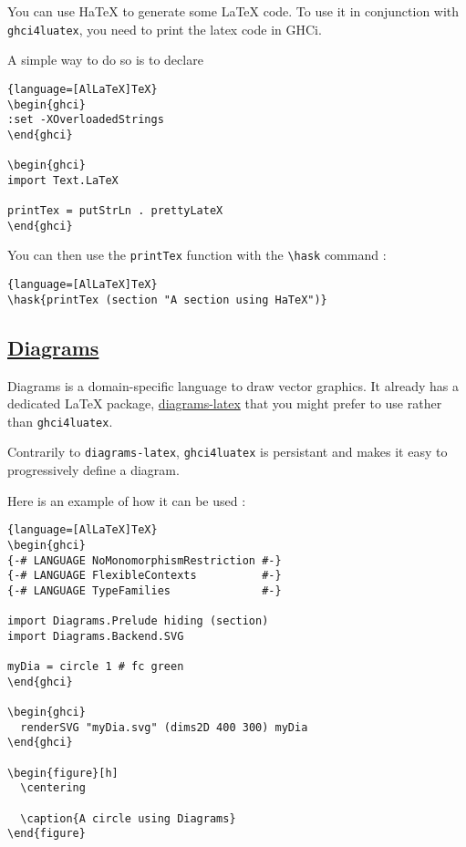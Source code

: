 \documentclass{article}
\begin{document}
You can use HaTeX to generate some LaTeX code. To use it in conjunction with \texttt{ghci4luatex}, you need to print the latex code in GHCi.

A simple way to do so is to declare

\begin{latexbox}
  \begin{lstlisting}{language=[AlLaTeX]TeX}
\begin{ghci}
:set -XOverloadedStrings
\end{ghci}

\begin{ghci}
import Text.LaTeX

printTex = putStrLn . prettyLateX
\end{ghci}
\end{lstlisting}
\end{latexbox}

You can then use the \texttt{printTex} function with the \texttt{\textbackslash hask} command :

\begin{lstlisting}{language=[AlLaTeX]TeX}
\hask{printTex (section "A section using HaTeX")}
\end{lstlisting}

\subsection{\href{https://diagrams.github.io/}{Diagrams}}

Diagrams is a domain-specific language to draw vector graphics. It already has a dedicated LaTeX package, \href{https://archives.haskell.org/projects.haskell.org/diagrams/doc/latex.html}{diagrams-latex} that you might prefer to use rather than \texttt{ghci4luatex}.

Contrarily to \texttt{diagrams-latex}, \texttt{ghci4luatex} is persistant and makes it easy to progressively define a diagram.

Here is an example of how it can be used :


\begin{latexbox}
  \begin{lstlisting}{language=[AlLaTeX]TeX}
\begin{ghci}
{-# LANGUAGE NoMonomorphismRestriction #-}
{-# LANGUAGE FlexibleContexts          #-}
{-# LANGUAGE TypeFamilies              #-}

import Diagrams.Prelude hiding (section)
import Diagrams.Backend.SVG

myDia = circle 1 # fc green
\end{ghci}

\begin{ghci}
  renderSVG "myDia.svg" (dims2D 400 300) myDia
\end{ghci}

\begin{figure}[h]
  \centering
  
  \caption{A circle using Diagrams}
\end{figure}

\end{lstlisting}
\end{latexbox}
\end{document}

